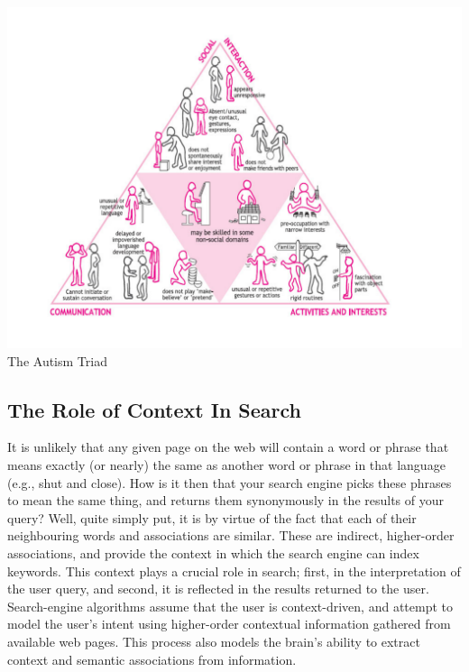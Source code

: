 \documentclass[a4paper, 11pt]{article}
\begin{document}
\begin{center}
\includegraphics[scale=0.5]{asd}\\
The Autism Triad \cite{triad}
\end{center}

\subsection{The Role of Context In Search} \label{the problem}
It is unlikely that any given page on the web will contain a word or phrase that means exactly (or nearly) the same as another word or phrase in that language (e.g., shut and close). How is it then that your search engine picks these phrases to mean the same thing, and returns them synonymously in the results of your query? Well, quite simply put, it is by virtue of the fact that each of their neighbouring words and associations are similar. These are indirect, higher-order associations, and provide the context in which the search engine can index keywords. This context plays a crucial role in search; first, in the interpretation of the user query, and second, it is reflected in the results returned to the user.\\
Search-engine algorithms assume that the user is context-driven, and attempt to model the user's intent using higher-order contextual information gathered from available web pages. This process also models the brain's ability to extract context and semantic associations from information.\\
\end{document}
